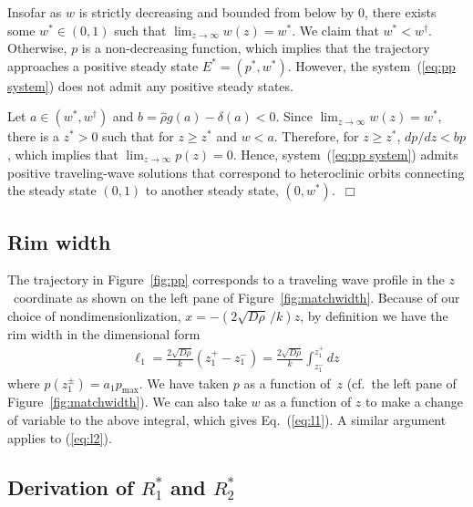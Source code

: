 \documentclass{aims}
\numberwithin{equation}{section}
\begin{document}
Insofar as $w$ is strictly decreasing and bounded from below by 0, 
there exists some $w^*\in(0,1)$ such that $\lim_{z \rightarrow \infty} w(z)=w^*$. 
We claim that $w^*<w^{\dagger}$.
Otherwise, $p$ is a non-decreasing function, which implies that the trajectory approaches a positive steady state $E^*=(p^*, w^*)$.   
However, the system~(\ref{eq:pp system}) does not admit any positive steady states. 

Let $a \in (w^*, w^{\dagger})$ and $b=\hat{\rho}g(a)-\delta(a) <0$.   Since
$\lim_{z \rightarrow \infty}w(z)=w^*$, there is a $z^*>0$ such that for
$z \geq z^*$ and $w<a$.  Therefore, for $z \geq z^*$, 
$dp/dz <bp$, which implies that $\lim_{z \rightarrow \infty} p(z)=0$.
Hence, system~(\ref{eq:pp system}) admits positive traveling-wave solutions that
correspond to heteroclinic orbits connecting the steady state $(0, 1)$ to 
another steady state, $(0, w^*)$.~$\Box$

\subsection*{Rim width}
The trajectory in Figure~\ref{fig:pp} corresponds to a traveling wave profile in the
$z$~coordinate as shown on the left pane of Figure~\ref{fig:matchwidth}. Because of our
choice of nondimensionlization, $x=-\left(2 \sqrt{D\rho}\,/k\right) z$, 
by definition we have the rim width in the dimensional form  
\begin{eqnarray}
\ell_1= \frac{2 \sqrt{D\rho}}{k} (z_1^+ - z_1^-) = \frac{2 \sqrt{D\rho}}{k} \int_{z_1^-}^{z_1^+} dz\
\end{eqnarray}
where $p(z^{\pm}_1)=a_1 p_{\max}$.  We have taken $p$ as a function of~$z$
(cf.\ the left pane of Figure~\ref{fig:matchwidth}). We can also take $w$ as a function of
$z$ to make a change of variable to the above integral, which gives Eq.~(\ref{eq:l1}).
A similar argument applies to (\ref{eq:l2}).
 
\subsection*{Derivation of $R_1^*$ and $R_2^*$}
\end{document}
